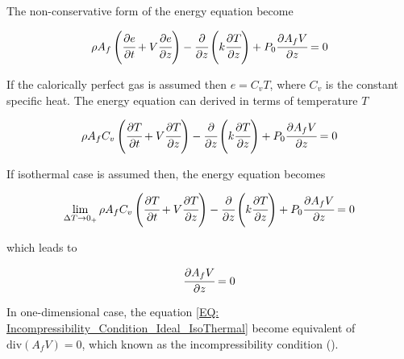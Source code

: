 \documentclass[../Parameter_fitting.tex]{subfiles}
\begin{document}
	The non-conservative form of the energy equation become
	
	{\footnotesize
		\begin{equation*}
		\rho A_f \left( \cfrac{\partial e }{\partial t} + V \cfrac{\partial e}{\partial z} \right) - \cfrac{\partial}{\partial z} \left( k \cfrac{\partial T}{\partial z} \right) + P_0 \cfrac{\partial A_f V}{\partial z} = 0
		\end{equation*}
	}
	
	If the calorically perfect gas is assumed then $e=C_vT$, where $C_v$ is the constant specific heat. The energy equation can derived in terms of temperature $T$
	
	{\footnotesize
		\begin{equation*}
			\rho A_f C_v \left( \cfrac{\partial T }{\partial t} + V \cfrac{\partial T}{\partial z} \right) - \cfrac{\partial}{\partial z} \left( k \cfrac{\partial T}{\partial z} \right) + P_0 \cfrac{\partial A_f V}{\partial z} = 0
		\end{equation*}
	}
	
	If isothermal case is assumed then, the energy equation becomes
	
	{\footnotesize
		\begin{equation*}
			\lim_{\Delta T \rightarrow 0_+} \rho A_f C_v \left( \cfrac{\partial T }{\partial t} + V \cfrac{\partial T}{\partial z} \right) - \cfrac{\partial}{\partial z} \left( k \cfrac{\partial T}{\partial z} \right) + P_0 \cfrac{\partial A_f V}{\partial z} = 0
		\end{equation*}
	}
	
	which leads to
	
	{\footnotesize
		\begin{equation}
			\cfrac{\partial A_f V}{\partial z} = 0
			\label{EQ: Incompressibility_Condition_Ideal_IsoThermal}
		\end{equation}
	}
	
	In one-dimensional case, the equation \ref{EQ: Incompressibility_Condition_Ideal_IsoThermal} become equivalent of $\text{div} ( A_f V) = 0$, which known as the incompressibility condition (\citet{Lions2013}). 
	
	
	
	
	
	
	
	
	
	
	
	
	
	
\end{document}
